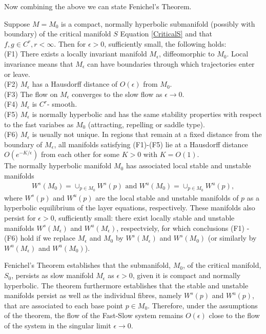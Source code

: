 Now combining the above we can state Fenichel's Theorem.

\begin{theorem} \label{Fenichel}	
	Suppose $M=M_0$ is a compact, normally hyperbolic submanifold  (possibly with boundary) of the critical manifold $S$ Equation \ref{CriticalS} 	and  that $f, g \in C^r, r < \infty $. Then for $\epsilon >0$, sufficiently small, the following holds:\\
	(F1) There exists a locally invariant manifold $M_{\epsilon}$, diffeomorphic to  $M_0$. Local invariance means that $M_{\epsilon}$ can have boundaries through which trajectories enter or leave.\\
	(F2) $M_{\epsilon}$ has a Hausdorff distance of $O(\epsilon)$ from $M_0$.\\
	(F3) The flow on $M_{\epsilon}$  converges to the slow flow as $\epsilon \to 0$.\\
	(F4) $M_{\epsilon}$ is $C^r$- smooth.\\
	(F5) $M_{\epsilon}$ is normally hyperbolic and has the same stability properties with respect to the fast variabes as $M_0$ (attracting, repelling or saddle type).\\
	(F6) $M_{\epsilon}$ is usually not unique. In regions that remain at a fixed distance from the boundary of  $M_{\epsilon}$, all manifolds satisfying (F1)-(F5) lie at a Hausdorff distance $O(e^{-K/\epsilon})$ from each other for some $K>0$ with $K=O(1)$.\\
	The normally hyperbolic manifold $M_0$ has associated local stable and unstable manifolds
	\begin{align*}
	W^s(M_0) =\cup_{p \in M_0} W^s(p) \textrm{\ \ and\ \ } W^u(M_0) =\cup_{p \in M_0} W^u(p),
	\end{align*}
	where  $W^s(p)$ and $W^u(p)$ are the local stable and unstable manifolds of $p$ as a hyperbolic equilibrium of the layer equations, respectively. These manifolds also persist for $\epsilon > 0$, sufficiently small: there exist locally stable and unstable manifolds $W^s(M_\epsilon)$ and $W^u(M_\epsilon)$, respectviely, for which conclusions (F1) - (F6) hold if we replace $M_\epsilon$ and $M_0$ by  $W^s(M_\epsilon)$ and $W^s(M_0)$ (or similarly by  $W^u(M_\epsilon)$ and $W^u(M_0)$).
\end{theorem} 
Fenichel's Theorem establishes that the submanifold, $M_0$, of the critical manifold, $S_0$, persists as slow manifold $M_\epsilon$ as $\epsilon >0$, given it is compact and normally hyperbolic. The theorem furthermore establishes that the stable and unstable manifolds persist as well as the individual fibres, namely $W^s(p)$ and $W^u(p)$, that are associated to each base point $p \in M_0$.
Therefore, under the assumptions of the theorem, the flow of the Fast-Slow system remains $O(\epsilon)$ close to the flow of the system in the singular limit $\epsilon \to 0$.\\

